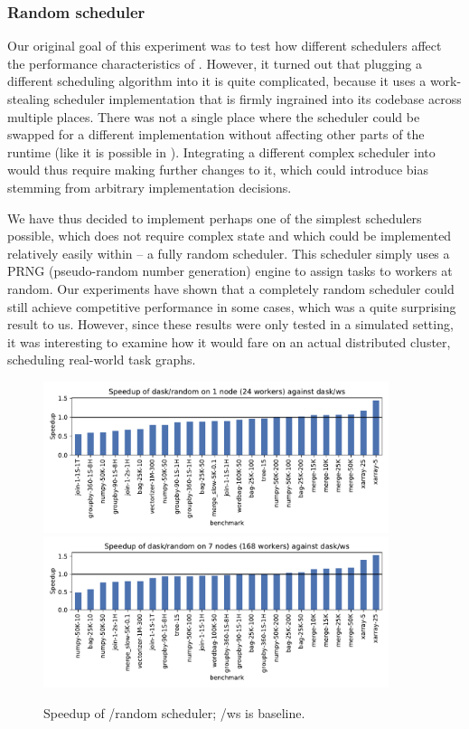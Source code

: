 \subsubsection*{Random scheduler}
Our original goal of this experiment was to test how different schedulers affect the performance
characteristics of \dask{}. However, it turned out that plugging a different
scheduling algorithm into it is quite complicated, because it uses a work-stealing scheduler
implementation that is firmly ingrained into its codebase across multiple places. There was not a
single place where the scheduler could be swapped for a different implementation without affecting
other parts of the runtime (like it is possible in \estee{}). Integrating a
different complex scheduler into \dask{} would thus require making further
changes to it, which could introduce bias stemming from arbitrary implementation decisions.

We have thus decided to implement perhaps one of the simplest schedulers possible, which does not
require complex state and which could be implemented relatively easily within
\dask{} -- a fully random scheduler. This scheduler simply uses a PRNG
(pseudo-random number generation) engine to assign tasks to workers at random. Our
\estee{} experiments have shown that a completely random scheduler could still
achieve competitive performance in some cases, which was a quite surprising result to us. However,
since these results were only tested in a simulated setting, it was interesting to examine how it
would fare on an actual distributed cluster, scheduling real-world \dask{} task
graphs.

\begin{figure}
	\centering
	\includegraphics[width=0.9\textwidth]{imgs/rsds/charts/speedup-dask-random-1}
	\includegraphics[width=0.9\textwidth]{imgs/rsds/charts/speedup-dask-random-7}
	\caption{Speedup of \dask{}/random scheduler; \dask{}/ws is baseline.}
	\label{fig:dask-ws-vs-random}
\end{figure}

